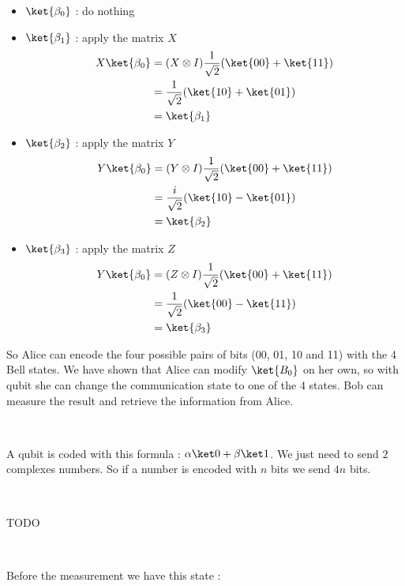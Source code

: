 \begin{itemize}
  \item $\ket{\beta_0}$ : do nothing
  \item $\ket{\beta_1}$ : apply the matrix $X$
    \begin{align*}
      X\ket{\beta_0} &= (X \otimes I) \frac{1}{\sqrt 2}(\ket{00} + \ket{11}) \\
      &= \frac{1}{\sqrt 2}(\ket{10} + \ket{01}) \\
      &= \ket{\beta_1}
    \end{align*}
  \item $\ket{\beta_2}$ : apply the matrix $Y$
    \begin{align*}
      Y\ket{\beta_0} &= (Y \otimes I) \frac{1}{\sqrt 2}(\ket{00} + \ket{11}) \\
      &= \frac{i}{\sqrt 2}(\ket{10} - \ket{01}) \\
      &= \ket{\beta_2}
    \end{align*}
  \item $\ket{\beta_3}$ : apply the matrix $Z$
    \begin{align*}
      Y\ket{\beta_0} &= (Z \otimes I) \frac{1}{\sqrt 2}(\ket{00} + \ket{11}) \\
      &= \frac{1}{\sqrt 2}(\ket{00} - \ket{11}) \\
      &= \ket{\beta_3}
    \end{align*}
\end{itemize}

So Alice can encode the four possible pairs of bits (00, 01, 10 and 11) with the
4 Bell states. We have shown that Alice can modify $\ket{B_0}$ on her own, so
with  qubit she can change the communication state to one of the 4 states. Bob
can measure the result and retrieve the information from Alice.

~

A qubit is coded with this formula : $\alpha \ket 0 + \beta \ket 1$.
We just need to send $2$ complexes numbers. So if a number is encoded with $n$
bits we send $4n$ bits.


\exo[Teleportation]~

TODO

~

Before the measurement we have this state :

